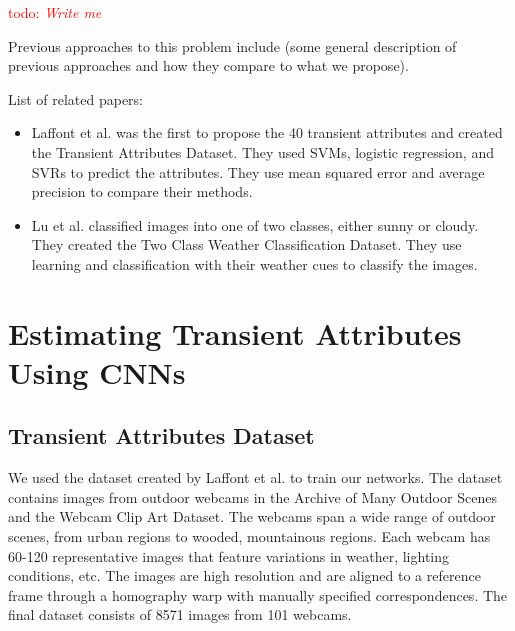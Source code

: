 \documentclass{article}
\newcommand{\todo}[1]{\textcolor{red}{todo: {\em #1}}}
\begin{document}
\todo{Write me}

Previous approaches to this problem include (some general description
of previous approaches and how they compare to what we propose).

List of related papers:
\begin{itemize}

	\item Laffont\cite{Laffont14} et al. was the first to propose the 40
		transient attributes and created the Transient Attributes Dataset.
		They used SVMs, logistic regression, and SVRs to predict the 
		attributes.  They use mean squared error and average precision to
		compare their methods.

	\item Lu\cite{lutwoclass} et al. classified images into one of two 
		classes, either sunny or cloudy.  They created the Two Class 
		Weather Classification Dataset.  They use learning and classification
		with their weather cues to classify the images. 

\end{itemize}

\section{Estimating Transient Attributes Using CNNs}

\subsection{Transient Attributes Dataset}
\indent

We used the dataset created by Laffont\cite{Laffont14} et al. to train our 
networks. The dataset contains images from outdoor webcams in the  
Archive of Many Outdoor Scenes\cite{jacobs07amos} and the Webcam Clip Art 
Dataset\cite{lalondesig09}.  The webcams span a wide range of outdoor scenes,
from urban regions to wooded, mountainous regions. Each webcam has 60-120 
representative images that feature variations in weather, lighting conditions, 
etc.  The images are high resolution and are aligned to a reference frame 
through a homography warp with manually specified correspondences.  The final
dataset consists of 8571 images from 101 webcams.

\end{document}

